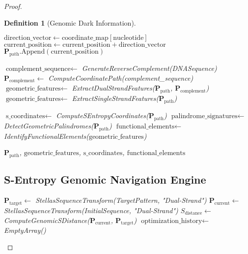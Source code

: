 \documentclass[12pt,a4paper]{article}
\newtheorem{definition}{Definition}
\begin{document}
\begin{proof}
\begin{definition}[Genomic Dark Information]
\begin{algorithm}[H]
\begin{algorithmic}[1]
        \State $\text{direction\_vector} \gets \text{coordinate\_map}[\text{nucleotide}]$
        \State $\text{current\_position} \gets \text{current\_position} + \text{direction\_vector}$
        \State $\mathbf{P}_{\text{path}}.\text{Append}(\text{current\_position})$
    \EndFor
    
        \State $\text{complement\_sequence} \gets$ GenerateReverseComplement(DNASequence)
        \State $\mathbf{P}_{\text{complement}} \gets$ ComputeCoordinatePath(complement\_sequence)
        \State $\text{geometric\_features} \gets$ ExtractDualStrandFeatures($\mathbf{P}_{\text{path}}$, $\mathbf{P}_{\text{complement}}$)
    \Else
        \State $\text{geometric\_features} \gets$ ExtractSingleStrandFeatures($\mathbf{P}_{\text{path}}$)
    \EndIf
    
    \State $\text{s\_coordinates} \gets$ ComputeSEntropyCoordinates($\mathbf{P}_{\text{path}}$)
    \State $\text{palindrome\_signatures} \gets$ DetectGeometricPalindromes($\mathbf{P}_{\text{path}}$)
    \State $\text{functional\_elements} \gets$ IdentifyFunctionalElements($\text{geometric\_features}$)
    
    \State \Return $\mathbf{P}_{\text{path}}$, $\text{geometric\_features}$, $\text{s\_coordinates}$, $\text{functional\_elements}$
\EndProcedure
\end{algorithmic}
\end{algorithm}

\subsection{S-Entropy Genomic Navigation Engine}

\begin{algorithm}[H]
\caption{S-Entropy Genomic Pattern Navigation}
\label{alg:s_entropy_genomic_navigation}
\begin{algorithmic}[1]
    \State $\mathbf{P}_{\text{target}} \gets$ StellasSequenceTransform(TargetPattern, "Dual-Strand")
    \State $\mathbf{P}_{\text{current}} \gets$ StellasSequenceTransform(InitialSequence, "Dual-Strand")
    \State $S_{\text{distance}} \gets$ ComputeGenomicSDistance($\mathbf{P}_{\text{current}}$, $\mathbf{P}_{\text{target}}$)
    \State $\text{optimization\_history} \gets$ EmptyArray()
    

\end{algorithmic}
\end{algorithm}
\end{definition}
\end{proof}
\end{document}
